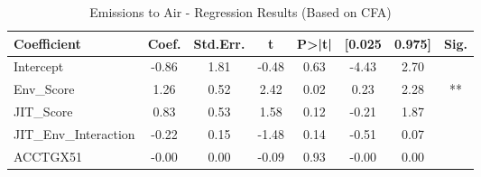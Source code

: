 \begin{table}[htbp]
    \centering
    \caption{Emissions to Air - Regression Results (Based on CFA)}
    \label{tab:regression}
    \begin{tabular}{lccccccc}
\toprule
Coefficient & Coef. & Std.Err. & t & P>|t| & [0.025 & 0.975] & Sig. \\
\midrule
Intercept & -0.86 & 1.81 & -0.48 & 0.63 & -4.43 & 2.70 &  \\
Env\_Score & 1.26 & 0.52 & 2.42 & 0.02 & 0.23 & 2.28 & ** \\
JIT\_Score & 0.83 & 0.53 & 1.58 & 0.12 & -0.21 & 1.87 &  \\
JIT\_Env\_Interaction & -0.22 & 0.15 & -1.48 & 0.14 & -0.51 & 0.07 &  \\
ACCTGX51 & -0.00 & 0.00 & -0.09 & 0.93 & -0.00 & 0.00 &  \\
\bottomrule
\end{tabular}

    \end{table}
    